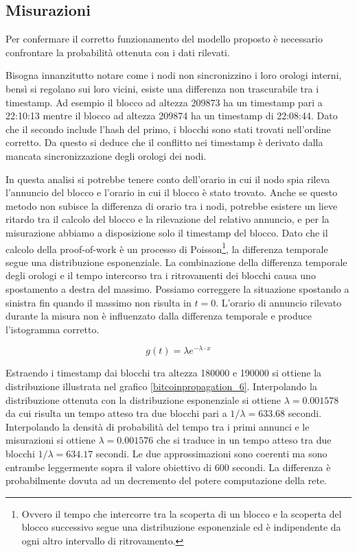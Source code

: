 \subsection{Misurazioni}\label{misurazioni}

Per confermare il corretto funzionamento del modello proposto è necessario confrontare la probabilità ottenuta con i dati rilevati.

Bisogna innanzitutto notare come i nodi non sincronizzino i loro orologi interni, bensì si regolano sui loro vicini, esiste una differenza non trascurabile tra i timestamp. Ad esempio il blocco ad altezza 209873 ha un timestamp pari a 22:10:13 mentre il blocco ad altezza 209874 ha un timestamp di 22:08:44. Dato che il secondo include l'hash del primo, i blocchi sono stati trovati nell'ordine corretto. Da questo si deduce che il conflitto nei timestamp è derivato dalla mancata sincronizzazione degli orologi dei nodi.

In questa analisi si potrebbe tenere conto dell'orario in cui il nodo spia rileva l'annuncio del blocco e l'orario in cui il blocco è stato trovato. Anche se questo metodo non subisce la differenza di orario tra i nodi, potrebbe esistere un lieve ritardo tra il calcolo del blocco e la rilevazione del relativo annuncio, e per la misurazione abbiamo a disposizione solo il timestamp del blocco. Dato che il calcolo della proof-of-work è un processo di Poisson\footnote{Ovvero il tempo che intercorre tra la scoperta di un blocco e la scoperta del blocco successivo segue una distribuzione esponenziale ed è indipendente da ogni altro intervallo di ritrovamento.}, la differenza temporale segue una distribuzione esponenziale. La combinazione della differenza temporale degli orologi e il tempo intercorso tra i ritrovamenti dei blocchi causa uno spostamento a destra del massimo. Possiamo correggere la situazione spostando a sinistra fin quando il massimo non risulta in $t=0$. L'orario di annuncio rilevato durante la misura non è influenzato dalla differenza temporale e produce l'istogramma corretto.

\[ g(t) = \lambda e^{-\lambda \cdot x}\]

Estraendo i timestamp dai blocchi tra altezza 180000 e 190000 si ottiene la distribuzione illustrata nel grafico \ref{bitcoinpropagation_6}. Interpolando la distribuzione ottenuta con la distribuzione esponenziale si ottiene $\lambda = 0.001578$ da cui risulta un tempo atteso tra due blocchi pari a $1 / \lambda = 633.68$ secondi. Interpolando la densità di probabilità del tempo tra i primi annunci e le misurazioni si ottiene $\lambda = 0.001576$ che si traduce in un tempo atteso tra due blocchi $1/ \lambda = 634.17$ secondi. Le due approssimazioni sono coerenti ma sono entrambe leggermente sopra il valore obiettivo di 600 secondi. La differenza è probabilmente dovuta ad un decremento del potere computazione della rete.

